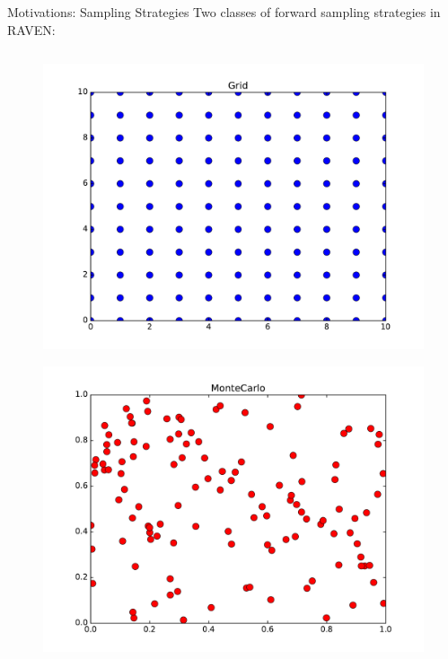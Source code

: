 \documentclass[t,9pt,svgnames]{beamer}
\newcommand{\vspacehack}{
\setbox0=\vbox{
\begin{itemize}
\item
\end{itemize}
}}
\begin{document}
\begin{frame}{Motivations: Sampling Strategies}
  \vfill
  Two classes of forward sampling strategies in RAVEN:
  \begin{columns}
    \begin{column}{0.5\textwidth}
      \begin{figure}
        \includegraphics[width=0.7\linewidth]{pics/grid.pdf}
      \end{figure}
      \begin{figure}
        \includegraphics[width=0.7\linewidth]{pics/mc.pdf}
      \end{figure}
    \end{column}
  \end{columns}
  \vfill
\end{frame}
\end{document}
